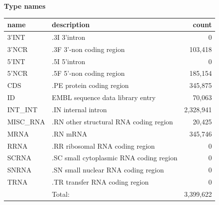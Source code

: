 \documentclass{article}
\begin{document}
\begin{Schunk}
\textbf{Type names}
\noindent\begin{tabular}{llr}
\hline \hline
name & description & count \\
\hline
3'INT  &  .3I 3'intron  &  0 \\
3'NCR  &  .3F  3'-non coding region  &  103,418 \\
5'INT  &  .5I 5'intron  &  0 \\
5'NCR  &  .5F  5'-non coding region  &  185,154 \\
CDS  &  .PE protein coding region  &  345,875 \\
ID  &  EMBL sequence data library entry  &  70,063 \\
INT\_INT  &  .IN  internal intron  &  2,328,941 \\
MISC\_RNA  &  .RN other structural RNA coding region  &  20,425 \\
MRNA  &  .RN mRNA  &  345,746 \\
RRNA  &  .RR ribosomal RNA coding region  &  0 \\
SCRNA  &  .SC small cytoplasmic RNA coding region  &  0 \\
SNRNA  &  .SN small nuclear RNA coding region  &  0 \\
TRNA  &  .TR transfer RNA coding region  &  0 \\
\hline
 & Total: & 3,399,622 \\
\hline \hline
\end{tabular}


\end{Schunk}
\end{document}
